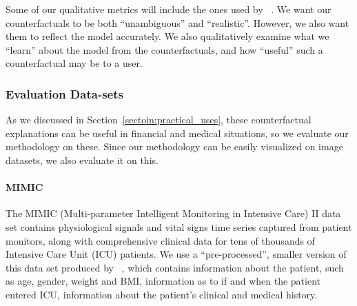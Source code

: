 \documentclass{article}
\begin{document}
Some of our qualitative metrics will include the ones used by~\cite{schut_generating_2021}
. We want our counterfactuals to be both ``unambiguous'' and ``realistic''. However, we also want them to reflect the model accurately. We also qualitatively examine what we ``learn'' about the model from the counterfactuals, and how ``useful'' such a counterfactual may be to a user.

\subsubsection{Evaluation Data-sets}
As we discussed in Section~\ref{sectoin:practical_uses}, these counterfactual explanations can be useful in financial and medical situations, so we evaluate our methodology on these. Since our methodology can be easily visualized on image datasets, we also evaluate it on this.



\paragraph{MIMIC}
The MIMIC (Multi-parameter Intelligent Monitoring in Intensive Care) II data set \citep{saeed_mimic-ii_2011}
contains physiological signals and vital signs time series captured from patient monitors, along with comprehensive clinical data for tens of thousands of Intensive Care Unit (ICU) patients. 
We use a ``pre-processed'', smaller version of this data set produced by~\cite{raffa_clinical_2016}
, which contains information about the patient, such as age, gender, weight and BMI, information as to if and when the patient entered ICU, information about the patient's clinical and medical history. 
\end{document}
